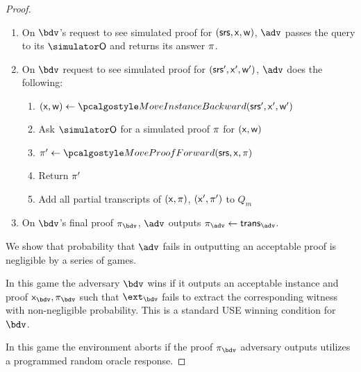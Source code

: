 \documentclass[runningheads,11pt]{llncs}
\begin{document}
\begin{proof}
\begin{enumerate}
  \item On $\bdv$'s request to see simulated proof for
    $(\mathsf{srs}, \mathsf{x}, \mathsf{w})$, $\adv$ passes the query to its $\simO$ and
    returns its answer $\pi$. 
  \item On $\bdv$ request to see simulated proof for
    $(\mathsf{srs}', \mathsf{x}', \mathsf{w}')$, $\adv$ does the following:
    \begin{enumerate}
    \item $(\inp, \wit) \gets \MoveInstanceBackward(\srs', \inp', \wit')$
    \item Ask $\simO$ for a simulated proof $\pi$ for $(\mathsf{x}, \mathsf{w})$
    \item $\zkproof' \gets \MoveProofForward(\srs, \inp, \zkproof)$
    \item Return $\pi'$
    \item Add all partial transcripts of $(\mathsf{x}, \pi)$, $(\mathsf{x}', \pi')$ to $Q_m$ 
    \end{enumerate}
  \item On $\bdv$'s final proof $\zkproofb$, $\adv$ outputs $\zkproofa \gets \tra$.
  \end{enumerate}

  We show that probability that $\adv$ fails in outputting an acceptable proof is negligible by a series of games. 

   In this game the adversary $\bdv$ wins if it outputs an acceptable instance and proof $\inpb, \zkproofb$ such that $\ext_\bdv$ fails to extract the corresponding witness with non-negligible probability. This is a standard USE winning condition for $\bdv$.

   In this game the environment aborts if the proof $\zkproofb$ adversary outputs utilizes a programmed random oracle response.


\end{proof}
\end{document}
